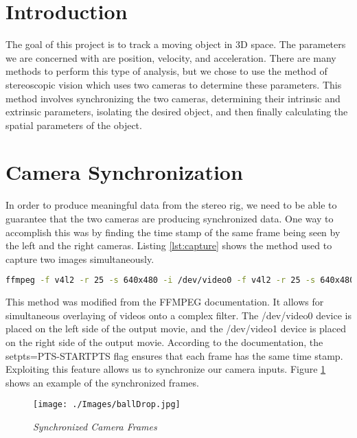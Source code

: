 \documentclass{IEEEtran}
\begin{document}

\vfill



\section{Introduction}
The goal of this project is to track a moving object in 3D space. The parameters we are concerned with are position, velocity, and acceleration. There are many methods to perform this type of analysis, but we chose to use the method of stereoscopic vision which uses two cameras to determine these parameters. This method involves synchronizing the two cameras, determining their intrinsic and extrinsic parameters, isolating the desired object, and then finally calculating the spatial parameters of the object.


\section{Camera Synchronization}
In order to produce meaningful data from the stereo rig, we need to be able to guarantee that the two cameras are producing synchronized data. One way to accomplish this was by finding the time stamp of the same frame being seen by the left and the right cameras. Listing \ref{lst:capture} shows the method used to capture two images simultaneously.

\begin{lstlisting}[caption={Bash Camera Capture Code},label={lst:capture},language=bash]
ffmpeg -f v4l2 -r 25 -s 640x480 -i /dev/video0 -f v4l2 -r 25 -s 640x480 -i /dev/video1 -filter_complex "nullsrc=size=1280x480 [base]; [0:v] setpts=PTS-STARTPTS, scale=640x480 [left]; [1:v] setpts=PTS-STARTPTS, scale=640x480 [right]; [base][left] overlay=shortest=1 [tmp1]; [tmp1][right] overlay=shortest=1:x=640" -c:v libx264 output.mp4
\end{lstlisting}

This method was modified from the FFMPEG documentation. It allows for simultaneous overlaying of videos onto a complex filter. The /dev/video0 device is placed on the left side of the output movie, and the /dev/video1 device is placed on the right side of the output movie\cite{multVid}. According to the documentation, the setpts=PTS-STARTPTS flag ensures that each frame has the same time stamp. Exploiting this feature allows us to synchronize our camera inputs. Figure \ref{ballbouncy} shows an example of the synchronized frames.

 \begin{figure}[httb]
  \centering
  \texttt{[image: ./Images/ballDrop.jpg]}
  \caption{\emph{Synchronized Camera Frames}}
  \label{ballbouncy}
\end{figure}
\end{document}
